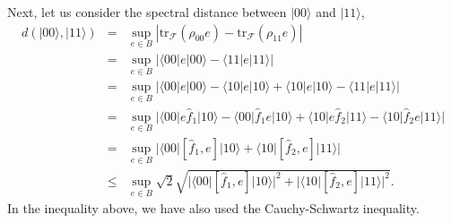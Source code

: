 \documentclass[a4paper,12pt]{article}
\begin{document}
Next, let us consider the spectral distance between $|00\rangle$ and $|11\rangle$,
\begin{eqnarray}\label{d0011}
	d(|00\rangle, |11\rangle)&=&\sup_{e\in B}|\mathrm{tr}_\mathcal{F}(\rho_{00} e)-\mathrm{tr}_\mathcal{F}(\rho_{11} e)|\nonumber\\
	&=&\sup_{e\in B}|\langle 00|e|00\rangle-\langle 11|e|11\rangle|\nonumber\\
	&=&\sup_{e\in B}|\langle 00|e|00\rangle-\langle 10|e|10\rangle+\langle 10|e|10\rangle-\langle 11|e|11\rangle|\nonumber\\
	&=&\sup_{e\in B}|\langle 00|e\hat{f}_1|10\rangle-\langle 00|\hat{f}_1 e|10\rangle+\langle 10|e\hat{f}_2|11\rangle-\langle 10|\hat{f}_2 e|11\rangle|\nonumber\\
	&=&\sup_{e\in B}|\langle 00|[\hat{f}_1,e]|10\rangle+\langle 10|[\hat{f}_2,e]|11\rangle|\nonumber\\
	&\leqslant&\sup_{e\in B}\sqrt{2}\sqrt{|\langle 00|[\hat{f}_1,e]|10\rangle|^2+|\langle 10|[\hat{f}_2,e]|11\rangle|^2}.
\end{eqnarray}
In the inequality above, we have also used the Cauchy-Schwartz inequality.
\end{document}
